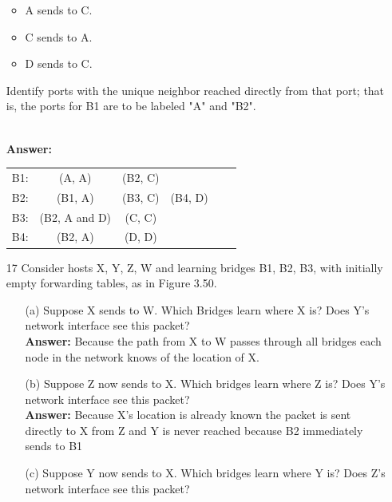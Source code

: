\documentclass[a4paper]{article}
\begin{document}
\begin{itemize}
	      \begin{itemize}
	      	\item A sends to C.
	      	\item C sends to A.
	      	\item D sends to C.
	      \end{itemize}
	      Identify ports with the unique neighbor reached directly from that port; that is, the ports for B1 are to be labeled "A" and "B2". \\
	       \\
	      \textbf{Answer:} \\
	      \begin{tabular}{c c c c c c}
	      	B1: & (A, A)        & (B2, C) &         \\
	      	B2: & (B1, A)       & (B3, C) & (B4, D) \\
	      	B3: & (B2, A and D) & (C, C)  &         \\
	      	B4: & (B2, A)       & (D, D)  &         \\
	      \end{tabular}
	\item[17] Consider hosts X, Y, Z, W and learning bridges B1, B2, B3, with initially empty forwarding tables, as in Figure 3.50.
	      \begin{itemize}
	      	\item[(a)] Suppose X sends to W. Which Bridges learn where X is? Does Y's network interface see this packet? \\
	      	      \textbf{Answer:} Because the path from X to W passes through all bridges each node in the network knows of the location of X.
	      	\item[(b)] Suppose Z now sends to X. Which bridges learn where Z is? Does Y's network interface see this packet? \\
	      	      \textbf{Answer:} Because X's location is already known the packet is sent directly to X from Z and Y is never reached because B2 immediately sends to B1
	      	\item[(c)] Suppose Y now sends to X. Which bridges learn where Y is? Does Z's network interface see this packet? \\

\end{itemize}
\end{itemize}
\end{document}

